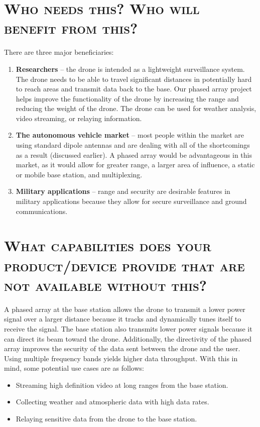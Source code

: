 \documentclass[11pt]{article}
\numberwithin{figure}{section}
\begin{document}
\section{\textsc{Who needs this? Who will benefit from this?}}
There are three major beneficiaries: 
	\begin{enumerate}
		\item \textbf{Researchers} -- the drone is intended as a lightweight surveillance system. The drone needs to be able to travel significant distances in potentially hard to reach areas and transmit data back to the base. Our phased array project helps improve the functionality of the drone by increasing the range and reducing the weight of the drone. The drone can be used for weather analysis, video streaming, or relaying information.
		\item \textbf{The autonomous vehicle market} -- most people within the market are using standard dipole antennas and are dealing with all of the shortcomings as a result (discussed earlier). A phased array would be advantageous in this market, as it would allow for greater range, a larger area of influence, a static or mobile base station, and multiplexing.
		\item \textbf{Military applications} -- range and security are desirable features in military applications because they allow for secure surveillance and ground communications.
	\end{enumerate}

\section{\textsc{What capabilities does your product/device provide that are not available without this?}}
A phased array at the base station allows the drone to transmit a lower power signal over a larger distance because it tracks and dynamically tunes itself to receive the signal. The base station also transmits lower power signals because it can direct its beam toward the drone. Additionally, the directivity of the phased array improves the security of the data sent between the drone and the user.  Using multiple frequency bands yields higher data throughput.  With this in mind, some potential use cases are as follows:
	\begin{itemize}
		\item Streaming high definition video at long ranges from the base station.
		\item Collecting weather and atmospheric data with high data rates.
		\item Relaying sensitive data from the drone to the base station.
	\end{itemize}
\end{document}
